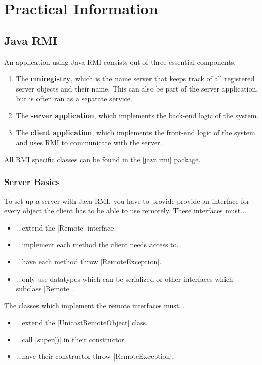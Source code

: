 \documentclass[a4paper]{article}
\begin{document}
\section{Practical Information}

\subsection{Java RMI}

An application using Java RMI consists out of three essential components.

\begin{enumerate}
\item The \textbf{rmiregistry}, which is the name server that keeps track of all registered server objects and their name. This can also be part of the server application, but is often ran as a separate service.
\item The \textbf{server application}, which implements the back-end logic of the system.
\item The \textbf{client application}, which implements the front-end logic of the system and uses RMI to communicate with the server.
\end{enumerate}

All RMI specific classes can be found in the |java.rmi| package.

\subsubsection{Server Basics}

To set up a server with Java RMI, you have to provide provide an interface for every object the client has to be able to use remotely. These interfaces must...

\begin{itemize}
\item ...extend the |Remote| interface.
\item ...implement each method the client needs access to.
\item ...have each method throw |RemoteException|.
\item ...only use datatypes which can be serialized or other interfaces which subclass |Remote|.
\end{itemize}

The classes which implement the remote interfaces must...

\begin{itemize}
\item ...extend the |UnicastRemoteObject| class.
\item ...call |super()| in their constructor.
\item ...have their constructor throw |RemoteException|.
\end{itemize}
\end{document}
